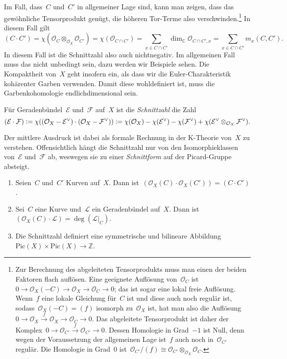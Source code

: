 \documentclass[a4paper,ngerman,12pt]{scrartcl}
\theoremstyle{definition}
\theoremstyle{plain}
\theoremstyle{remark}
\newcommand{\CC}{\mathbb{C}}
\newcommand{\ZZ}{\mathbb{Z}}
\newcommand{\E}{\mathcal{E}}
\newcommand{\F}{\mathcal{F}}
\renewcommand{\L}{\mathcal{L}}
\renewcommand{\O}{\mathcal{O}}
\newcommand{\Pic}{\mathrm{Pic}}
\newcommand{\defeq}{\vcentcolon=}
\begin{document}
Im Fall, dass~$C$ und~$C'$ in allgemeiner Lage sind, kann man zeigen, dass das
gewöhnliche Tensorprodukt genügt, die höheren Tor-Terme also
verschwinden.\footnote{Zur Berechnung des abgeleiteten Tensorprodukts muss man
einen der beiden Faktoren flach auflösen. Eine geeignete Auflösung von~$\O_C$
ist~$0 \to \O_X(-C) \to \O_X \to \O_C \to 0$; das ist sogar eine lokal freie
Auflösung. Wenn~$f$ eine lokale Gleichung für~$C$ ist und diese auch noch
regulär ist, sodass~$\O_X(-C) = (f)$ isomorph zu~$\O_X$ ist, hat man also die
Auflösung~$0 \to \O_X \stackrel{f}{\to} \O_X \to \O_C \to 0$. Das abgeleitete
Tensorprodukt ist daher der Komplex~$0 \to \O_{C'} \stackrel{f}{\to} \O_{C'}
\to 0$. Dessen Homologie in Grad~$-1$ ist Null, denn wegen der Voraussetzung
der allgemeinen Lage ist~$f$ auch noch in~$\O_{C'}$ regulär. Die Homologie in
Grad~$0$ ist~$\O_{C'}/(f) \cong \O_{C'} \otimes_{\O_X} \O_C$.}
In diesem Fall gilt
\[ (C \cdot C') = \chi(\O_C \otimes_{\O_X} \O_{C'}) = \chi(\O_{C \cap C'}) =
  \sum_{x \in C \cap C'} \dim_\CC \O_{C \cap C',x} =
  \sum_{x \in C \cap C'} m_x(C,C'). \]
In diesem Fall ist die Schnittzahl also auch nichtnegativ. Im allgemeinen Fall
muss das nicht unbedingt sein, dazu werden wir Beispiele sehen. Die Kompaktheit
von~$X$ geht insofern ein, als dass wir die Euler-Charakteristik kohärenter
Garben verwenden. Damit diese wohldefiniert ist, muss die Garbenkohomologie
endlichdimensional sein.

\begin{defn}Für Geradenbündel~$\E$ und~$\F$ auf~$X$ ist die \emph{Schnittzahl}
die Zahl
\[ (\E \cdot \F) \defeq
  \chi((\O_X - \E^\vee) \cdot (\O_X - \F^\vee)) \defeq
  \chi(\O_X) - \chi(\E^\vee) - \chi(\F^\vee) + \chi(\E^\vee \otimes_{\O_X}
  \F^\vee). \]
\end{defn}
Der mittlere Ausdruck ist dabei als formale Rechnung in der K-Theorie von~$X$
zu verstehen. Offensichtlich hängt die Schnittzahl nur von den
Isomorphieklassen von~$\E$ und~$\F$ ab, weswegen sie zu einer
\emph{Schnittform} auf der Picard-Gruppe absteigt.

\begin{prop}\begin{enumerate}
\item Seien~$C$ und~$C'$ Kurven auf~$X$. Dann ist~$(\O_X(C) \cdot \O_X(C')) = (C
\cdot C')$.
\item Sei~$C$ eine Kurve und~$\L$ ein Geradenbündel auf~$X$. Dann ist~$(\O_X(C)
\cdot \L) = \deg(\L|_C)$.
\item Die Schnittzahl definiert eine symmetrische und bilineare Abbildung
$\Pic(X) \times \Pic(X) \to \ZZ$.
\end{enumerate}\end{prop}
\end{document}
